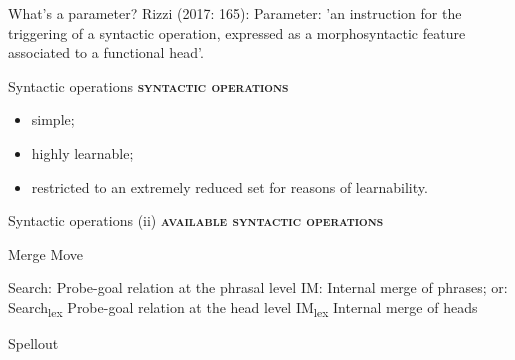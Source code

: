 \documentclass[lesson_slides]{subfiles}
\begin{document}
\begin{frame}[c]{What's a parameter?}
    Rizzi (2017: 165): Parameter: 'an instruction for the triggering of a syntactic operation, expressed as a morphosyntactic feature
associated to a functional head'.
\end{frame}
\begin{frame}[c]{Syntactic operations}
    \noindent\textbf{\textsc{syntactic operations}} 
    \begin{itemize}
        \item[\ding{227}] simple;
        \item[\ding{227}] highly learnable;
        \item[\ding{227}] restricted to an extremely reduced set for reasons of learnability.
    \end{itemize}	
\end{frame}
\begin{frame}[c]{Syntactic operations (ii)}
    \noindent\textbf{\textsc{available syntactic operations}} 
        \begin{xlist}
            \ex Merge
            \ex Move
                \begin{xlist}
                    \ex Search:	Probe-goal relation at the phrasal level
                    \ex IM:	Internal merge of phrases; or:
                    \ex Search\textsubscript{lex}	Probe-goal relation at the head level
                    \ex IM\textsubscript{lex}	Internal merge of heads
                \end{xlist}
            \ex Spellout
        \end{xlist}
\end{frame}
\end{document}

